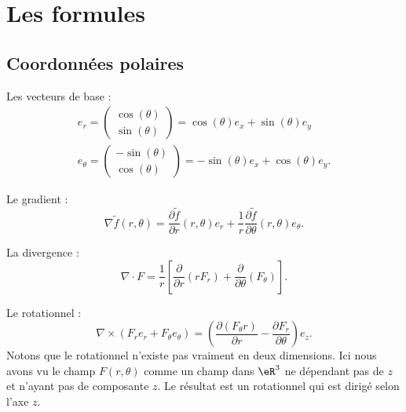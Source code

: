 \section{Les formules}

\subsection{Coordonnées polaires}

Les vecteurs de base :
\begin{subequations}
	\begin{align}
		e_r=\begin{pmatrix}
			\cos(\theta) \\
			\sin(\theta)
		\end{pmatrix}=\cos(\theta)e_x+\sin(\theta)e_y \\
		e_{\theta}=\begin{pmatrix}
			-\sin(\theta) \\
			\cos(\theta)
		\end{pmatrix}=-\sin(\theta)e_x+\cos(\theta)e_y.
	\end{align}
\end{subequations}

Le gradient :
\begin{equation}
	\nabla\tilde f(r,\theta)=\frac{ \partial \tilde f }{ \partial r }(r,\theta)e_r+\frac{1}{ r }\frac{ \partial \tilde f }{ \partial \theta }(r,\theta)e_{\theta}.
\end{equation}

La divergence :
\begin{equation}    \label{EqgRxJKd}
	\nabla\cdot F=\frac{1}{ r }\left[ \frac{ \partial  }{ \partial r }(rF_r)+\frac{ \partial  }{ \partial \theta }(F_{\theta}) \right].
\end{equation}

Le rotationnel :
\begin{equation}    \label{EqtBnoCw}
	\nabla\times(F_re_r+F_{\theta}e_{\theta})=\left( \frac{ \partial (F_{\theta} r) }{ \partial r }-\frac{ \partial F_r }{ \partial \theta } \right)e_z.
\end{equation}
Notons que le rotationnel n'existe pas vraiment en deux dimensions. Ici nous avons vu le champ \( F(r,\theta)\) comme un champ dans \( \eR^3\) ne dépendant pas de \( z\) et n'ayant pas de composante \( z\). Le résultat est un rotationnel qui est dirigé selon l'axe \( z\).


